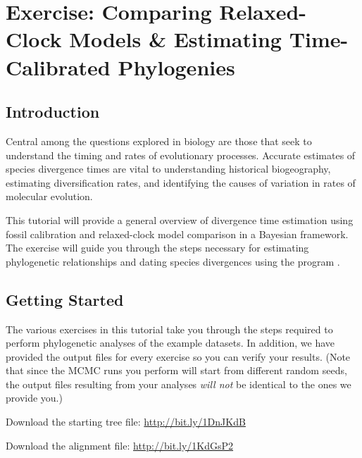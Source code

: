 \section{Exercise: Comparing Relaxed-Clock Models \& Estimating Time-Calibrated Phylogenies}

\subsection{Introduction}

Central among the questions explored in biology are those that seek to understand the timing and rates of evolutionary processes. Accurate estimates of species divergence times are vital to understanding historical biogeography, estimating diversification rates, and identifying the causes of variation in rates of molecular evolution. 

This tutorial will provide a general overview of divergence time estimation using fossil calibration and relaxed-clock model comparison in a Bayesian framework. The exercise will guide you through the steps necessary for estimating phylogenetic relationships and dating species divergences using the program \href{http://revbayes.github.io/}{\RevBayes}. 

%

\bigskip
\subsection{Getting Started}\label{gettingStarted}


The various exercises in this tutorial take you through the steps required to perform phylogenetic analyses of the example datasets. 
In addition, we have provided the output files for every exercise so you can verify your results. (Note that since the MCMC runs you perform will start from different random seeds, the output files resulting from your analyses \textit{will not} be identical to the ones we provide you.)

\begin{framed}
Download the starting tree file: \href{http://bit.ly/1DnJKdB}{http://bit.ly/1DnJKdB}

Download the alignment file: \href{http://bit.ly/1KdGsP2}{http://bit.ly/1KdGsP2}
\end{framed}

